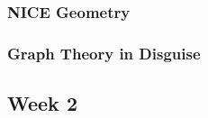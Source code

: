 \documentclass[titlepage=true]{scrartcl}
\begin{document}
    \subsubsection{NICE Geometry}
	\label{13.1.4}
	
	\newpage

    \subsubsection{Graph Theory in Disguise}
	\label{13.1.5}
	
	\newpage

\subsection{Week 2}
\end{document}
